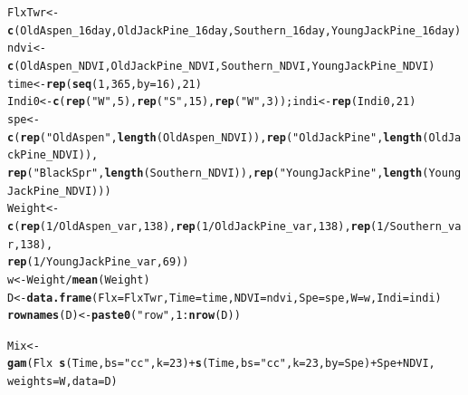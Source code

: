 \documentclass{article}\usepackage[]{graphicx}\usepackage[]{color}
\makeatletter
\newcommand{\hlnum}[1]{\textcolor[rgb]{0.686,0.059,0.569}{#1}}%
\newcommand{\hlstr}[1]{\textcolor[rgb]{0.192,0.494,0.8}{#1}}%
\newcommand{\hlopt}[1]{\textcolor[rgb]{0,0,0}{#1}}%
\newcommand{\hlstd}[1]{\textcolor[rgb]{0.345,0.345,0.345}{#1}}%
\newcommand{\hlkwb}[1]{\textcolor[rgb]{0.69,0.353,0.396}{#1}}%
\newcommand{\hlkwc}[1]{\textcolor[rgb]{0.333,0.667,0.333}{#1}}%
\newcommand{\hlkwd}[1]{\textcolor[rgb]{0.737,0.353,0.396}{\textbf{#1}}}%
\newenvironment{kframe}{%
 \def\at@end@of@kframe{}%
 \ifinner\ifhmode%
  \def\at@end@of@kframe{\end{minipage}}%
  \begin{minipage}{\columnwidth}%
 \fi\fi%
 \def\FrameCommand##1{\hskip\@totalleftmargin \hskip-\fboxsep
 \colorbox{shadecolor}{##1}\hskip-\fboxsep
     \hskip-\linewidth \hskip-\@totalleftmargin \hskip\columnwidth}%
 \MakeFramed {\advance\hsize-\width
   \@totalleftmargin\z@ \linewidth\hsize
   \@setminipage}}%
 {\par\unskip\endMakeFramed%
 \at@end@of@kframe}
\newenvironment{knitrout}{}{} %
\makeatother
\begin{document}
\begin{appendices}
\begin{knitrout}
\begin{kframe}
\begin{alltt}
\hlstd{FlxTwr} \hlkwb{<-} \hlkwd{c}\hlstd{(OldAspen_16day,OldJackPine_16day,Southern_16day,YoungJackPine_16day)}
\hlstd{ndvi} \hlkwb{<-} \hlkwd{c}\hlstd{(OldAspen_NDVI,OldJackPine_NDVI,Southern_NDVI,YoungJackPine_NDVI)}
\hlstd{time} \hlkwb{<-} \hlkwd{rep}\hlstd{(}\hlkwd{seq}\hlstd{(}\hlnum{1}\hlstd{,}\hlnum{365}\hlstd{,}\hlkwc{by}\hlstd{=}\hlnum{16}\hlstd{),}\hlnum{21}\hlstd{)}
\hlstd{Indi0} \hlkwb{<-} \hlkwd{c}\hlstd{(}\hlkwd{rep}\hlstd{(}\hlstr{"W"}\hlstd{,}\hlnum{5}\hlstd{),}\hlkwd{rep}\hlstd{(}\hlstr{"S"}\hlstd{,}\hlnum{15}\hlstd{),}\hlkwd{rep}\hlstd{(}\hlstr{"W"}\hlstd{,}\hlnum{3}\hlstd{)); indi} \hlkwb{<-} \hlkwd{rep}\hlstd{(Indi0,}\hlnum{21}\hlstd{)}
\hlstd{spe} \hlkwb{<-}\hlkwd{c}\hlstd{(}\hlkwd{rep}\hlstd{(}\hlstr{"OldAspen"}\hlstd{,}\hlkwd{length}\hlstd{(OldAspen_NDVI)),}\hlkwd{rep}\hlstd{(}\hlstr{"OldJackPine"}\hlstd{,}\hlkwd{length}\hlstd{(OldJackPine_NDVI)),}
\hlkwd{rep}\hlstd{(}\hlstr{"BlackSpr"}\hlstd{,}\hlkwd{length}\hlstd{(Southern_NDVI)),}\hlkwd{rep}\hlstd{(}\hlstr{"YoungJackPine"}\hlstd{,}\hlkwd{length}\hlstd{(YoungJackPine_NDVI)))}
\hlstd{Weight} \hlkwb{<-} \hlkwd{c}\hlstd{(}\hlkwd{rep}\hlstd{(}\hlnum{1}\hlopt{/}\hlstd{OldAspen_var,}\hlnum{138}\hlstd{),}\hlkwd{rep}\hlstd{(}\hlnum{1}\hlopt{/}\hlstd{OldJackPine_var,}\hlnum{138}\hlstd{),}\hlkwd{rep}\hlstd{(}\hlnum{1}\hlopt{/}\hlstd{Southern_var,}\hlnum{138}\hlstd{),}
\hlkwd{rep}\hlstd{(}\hlnum{1}\hlopt{/}\hlstd{YoungJackPine_var,}\hlnum{69}\hlstd{))}
\hlstd{w} \hlkwb{<-} \hlstd{Weight}\hlopt{/}\hlkwd{mean}\hlstd{(Weight)}
\hlstd{D} \hlkwb{<-} \hlkwd{data.frame}\hlstd{(}\hlkwc{Flx}\hlstd{=FlxTwr,}\hlkwc{Time}\hlstd{=time,}\hlkwc{NDVI}\hlstd{=ndvi,}\hlkwc{Spe}\hlstd{=spe,}\hlkwc{W}\hlstd{=w,}\hlkwc{Indi}\hlstd{=indi)}
\hlkwd{rownames}\hlstd{(D)} \hlkwb{<-} \hlkwd{paste0}\hlstd{(}\hlstr{"row"}\hlstd{,}\hlnum{1}\hlopt{:}\hlkwd{nrow}\hlstd{(D))}

\hlstd{Mix} \hlkwb{<-} \hlkwd{gam}\hlstd{(Flx} \hlopt{~} \hlkwd{s}\hlstd{(Time,}\hlkwc{bs}\hlstd{=}\hlstr{"cc"}\hlstd{,}\hlkwc{k}\hlstd{=}\hlnum{23}\hlstd{)}\hlopt{+}\hlkwd{s}\hlstd{(Time,}\hlkwc{bs}\hlstd{=}\hlstr{"cc"}\hlstd{,}\hlkwc{k}\hlstd{=}\hlnum{23}\hlstd{,}\hlkwc{by}\hlstd{=Spe)}\hlopt{+} \hlstd{Spe} \hlopt{+} \hlstd{NDVI,}
\hlkwc{weights} \hlstd{= W,}\hlkwc{data} \hlstd{= D)}
\end{alltt}
\end{kframe}
\end{knitrout}


\end{appendices}
\end{document}

